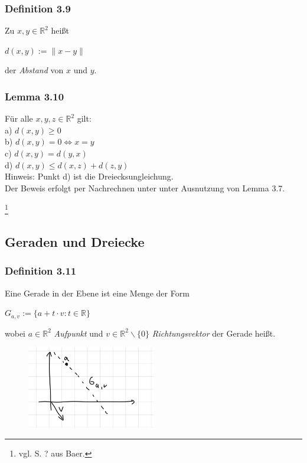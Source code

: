 \documentclass{article}
\begin{document}
\subsubsection*{Definition 3.9}
Zu $x,y \in \mathbb{R}^2$ heißt \\
\begin{center}
    $d(x,y) := \|x-y\|$
\end{center}
der \textit{Abstand} von $x$ und $y$. \\

\subsubsection*{Lemma 3.10}
Für alle $x,y,z \in \mathbb{R}^2$ gilt: \\
a) $d(x,y) \geq 0$ \\
b) $d(x,y) = 0 \Leftrightarrow x = y$ \\
c) $d(x,y) = d(y,x)$ \\
d) $d(x,y) \leq d(x,z) + d(z,y)$ \\
Hinweis: Punkt d) ist die Dreiecksungleichung. \\
Der Beweis erfolgt per Nachrechnen unter unter Ausnutzung von Lemma 3.7. \\
\newpage
\date{Donnerstag, 30.11.23} \footnote{vgl. S. ? aus Baer.}
\subsection{Geraden und Dreiecke}
\subsubsection*{Definition 3.11}
Eine Gerade in der Ebene ist eine Menge der Form \\
\begin{center}
    $G_{a,v} := \{a + t \cdot v: t \in \mathbb{R}\}$ \\
\end{center}
wobei $a \in \mathbb{R}^2$ \textit{Aufpunkt} und $v \in \mathbb{R}^2\backslash\{0\}$ \textit{Richtungsvektor} der Gerade heißt. \\
\begin{figure}[h]
    \centering
    \includegraphics[width=0.5\textwidth]{Images/3.11.jpeg}
    \caption{}
\end{figure}
\end{document}
